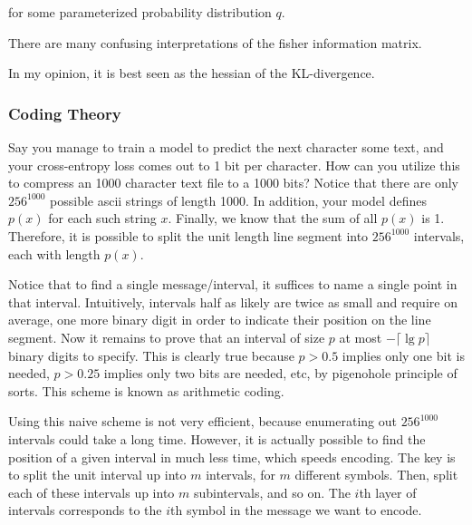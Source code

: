 \documentclass[12pt]{article}
\begin{document}
for some parameterized probability distribution $q$. 

There are many confusing interpretations of the fisher information matrix.

In my opinion, it is best seen as the hessian of the KL-divergence.


\subsubsection{Coding Theory}

Say you manage to train a model to predict the next character some text, and your cross-entropy loss comes out to 1 bit per character. How can you utilize this to compress an 1000 character text file to a 1000 bits? Notice that there are only $256^{1000}$ possible ascii strings of length 1000. In addition, your model defines $p(x)$ for each such string $x$. Finally, we know that the sum of all $p(x)$ is 1. Therefore, it is possible to split the unit length line segment into $256^{1000}$ intervals, each with length $p(x)$.

Notice that to find a single message/interval, it suffices to name a single point in that interval. Intuitively, intervals half as likely are twice as small and require on average, one more binary digit in order to indicate their position on the line segment. Now it remains to prove that an interval of size $p$ at most $- \lceil \lg p \rceil$ binary digits to specify. This is clearly true because $p > 0.5$ implies only one bit is needed, $p > 0.25$ implies only two bits are needed, etc, by pigenohole principle of sorts. This scheme is known as arithmetic coding.

Using this naive scheme is not very efficient, because enumerating out $256^{1000}$ intervals could take a long time. However, it is actually possible to find the position of a given interval in much less time, which speeds encoding. The key is to split the unit interval up into $m$ intervals, for $m$ different symbols. Then, split each of these intervals up into $m$ subintervals, and so on. The $i$th layer of intervals corresponds to the $i$th symbol in the message we want to encode.
\end{document}

